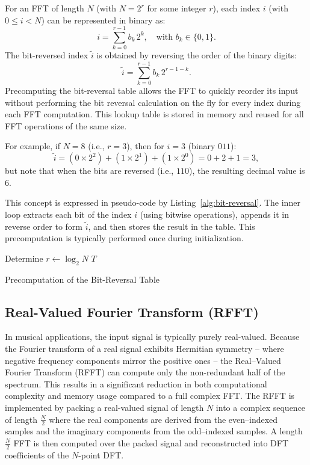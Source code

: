 \documentclass[12pt,letter]{article}
\begin{document}
For an FFT of length \( N \) (with \( N = 2^r \) for some integer \( r \)),
each index \( i \) (with \( 0 \leq i < N \)) can be represented in binary as:
$$
i = \sum_{k=0}^{r-1} b_k \, 2^k, \quad \text{with } b_k \in \{0,1\}.
$$
The bit-reversed index \( \tilde{i} \) is obtained by reversing the order of
the binary digits:
$$
\tilde{i} = \sum_{k=0}^{r-1} b_k \, 2^{r-1-k}.
$$
Precomputing the bit-reversal table allows the FFT to quickly reorder its
input without performing the bit reversal calculation on the fly for every
index during each FFT computation. This lookup table is stored in memory and
reused for all FFT operations of the same size.

For example, if \( N = 8 \) (i.e., \( r = 3 \)), then for \( i = 3 \)
(binary \( 011 \)):
$$
\tilde{i} = (0 \times 2^2) + (1 \times 2^1) + (1 \times 2^0) = 0 + 2 + 1 = 3,
$$
but note that when the bits are reversed (i.e., \( 110 \)), the resulting
decimal value is 6.

This concept is expressed in pseudo-code by Listing~\ref{alg:bit-reversal}.
The inner loop extracts each bit of the index \( i \) (using bitwise
operations), appends it in reverse order to form \( \tilde{i} \), and then
stores the result in the table. This precomputation is typically performed
once during initialization.

\begin{algorithm}[H]
\SetAlgoLined
{}
Determine \( r \gets \log_2 N \)\;
\Return \( T \)\;
\caption{Precomputation of the Bit-Reversal Table}
\label{alg:bit-reversal}
\end{algorithm}

\subsection{Real-Valued Fourier Transform (RFFT)}

In musical applications, the input signal is typically purely real-valued.
Because the Fourier transform of a real signal exhibits Hermitian
symmetry -- where negative frequency components mirror the positive ones --
the Real--Valued Fourier Transform (RFFT) can compute only the non-redundant
half of the spectrum. This results in a significant reduction in both
computational complexity and memory usage compared to a full complex FFT. The
RFFT is implemented by packing a real-valued signal of length $N$ into a
complex sequence of length $\frac{N}{2}$ where the real components are
derived from the even--indexed samples and the imaginary components from the
odd--indexed samples. A length $\frac{N}{2}$ FFT is then computed over the
packed signal and reconstructed into DFT coefficients of the $N$-point DFT.
\end{document}

